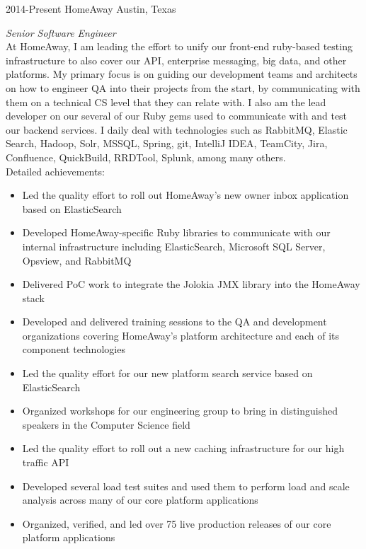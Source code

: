 \documentclass{friggeri-cv} %
\begin{document}
\begin{entrylist}
\entry
{2014-Present}
{HomeAway}
{Austin, Texas}
{\emph{Senior Software Engineer} \\
At HomeAway, I am leading the effort to unify our front-end ruby-based testing infrastructure to also cover our API, enterprise messaging, big data, and other platforms. My primary focus is on guiding our development teams and architects on how to engineer QA into their projects from the start, by communicating with them on a technical CS level that they can relate with. I also am the lead developer on our several of our Ruby gems used to communicate with and test our backend services. I daily deal with technologies such as RabbitMQ, Elastic Search, Hadoop, Solr, MSSQL, Spring, git, IntelliJ IDEA, TeamCity, Jira, Confluence, QuickBuild, RRDTool, Splunk, among many others. \\
Detailed achievements:
\begin{itemize}
\item Led the quality effort to roll out HomeAway's new owner inbox application based on ElasticSearch
\item Developed HomeAway-specific Ruby libraries to communicate with our internal infrastructure including ElasticSearch, Microsoft SQL Server, Opsview, and RabbitMQ
\item Delivered PoC work to integrate the Jolokia JMX library into the HomeAway stack
\item Developed and delivered training sessions to the QA and development organizations covering HomeAway's platform architecture and each of its component technologies
\item Led the quality effort for our new platform search service based on ElasticSearch
\item Organized workshops for our engineering group to bring in distinguished speakers in the Computer Science field
\item Led the quality effort to roll out a new caching infrastructure for our high traffic API
\item Developed several load test suites and used them to perform load and scale analysis across many of our core platform applications
\item Organized, verified, and led over 75 live production releases of our core platform applications
\end{itemize}}
\end{entrylist}
\end{document}
